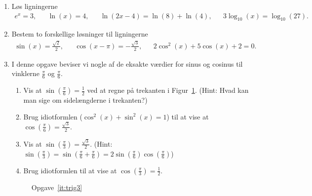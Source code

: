 \begin{enumerate}
	
	\item Løs ligningerne 
	\begin{align*}
	e^x=3,&& \ln(x)=4,&& \ln(2x-4)=\ln(8)+\ln(4),&& 3\log_{10}(x)=\log_{10}(27).
	\end{align*}
	

	\item Bestem to forskellige løsninger til ligningerne 
	\begin{align*}
	\sin(x)=\frac{\sqrt{2}}{2},&& \cos(x-\pi)=-\frac{\sqrt{3}}{2},&& 2\cos^2(x)+5\cos(x)+2=0.
	\end{align*}

\item \label{it:trig3} I denne opgave beviser vi nogle af de eksakte værdier for sinus og cosinus til vinklerne $ \frac{\pi}{6}$ og $ \frac{\pi}{6} $.

\begin{enumerate}
	\item Vis at $\sin(\frac{\pi}{6})=\frac{1}{2}$ ved at regne på trekanten i Figur~\ref{fig:trig3}. (Hint: Hvad kan man sige om sidelængderne i trekanten?)
	
	\item Brug idiotformlen ($ \cos^2(x)+\sin^2(x)=1 $) til at vise at $\cos(\frac{\pi}{6})=\frac{\sqrt{3}}{2}$.
	
	\item Vis at $\sin(\frac{\pi}{3})=\frac{\sqrt{3}}{2}$. (Hint: $ \sin(\frac{\pi}{3})=\sin(\frac{\pi}{6}+\frac{\pi}{6})=2\sin(\frac{\pi}{6})\cos(\frac{\pi}{6}) $)
	
	\item Brug idiotformlen til at vise at $\cos(\frac{\pi}{3})=\frac{1}{2}$.
	
\end{enumerate}

\begin{figure}
	\centering
	\caption{Opgave~\ref{it:trig3}}
	\label{fig:trig3}
\end{figure}


\end{enumerate}
